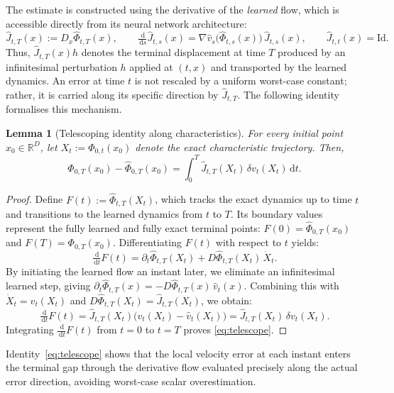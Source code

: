 \documentclass{article}
\newcommand{\R}{\mathbb{R}}
\newcommand{\Id}{\mathrm{Id}}
\newcommand{\dd}{\,\mathrm{d}}
\theoremstyle{plain}
\newtheorem{lemma}[theorem]{Lemma}
\theoremstyle{definition}
\theoremstyle{remark}
\begin{document}
The estimate is constructed using the derivative of the \emph{learned} flow, which is accessible directly from its neural network architecture:
\begin{equation}
  \hat{J}_{t,T}(x) := D_x\hat{\Phi}_{t,T}(x),
  \qquad
  \tfrac{\dd}{\dd s}\hat{J}_{t,s}(x) = \nabla\hat{v}_s\big(\hat{\Phi}_{t,s}(x)\big)\,\hat{J}_{t,s}(x),
  \qquad 
  \hat{J}_{t,t}(x) = \Id.
  \label{eq:jacobian-ode}
\end{equation}
Thus, $\hat{J}_{t,T}(x)h$ denotes the terminal displacement at time $T$ produced by an infinitesimal perturbation $h$ applied at $(t,x)$ and transported by the learned dynamics. An error at time $t$ is not rescaled by a uniform worst-case constant; rather, it is carried along its specific direction by $\hat{J}_{t,T}$. The following identity formalises this mechanism.

\begin{lemma}[Telescoping identity along characteristics]
\label{lem:telescope}
For every initial point $x_0 \in \R^D$, let $X_t := \Phi_{0,t}(x_0)$ denote the exact characteristic trajectory. Then,
\begin{equation}
  \Phi_{0,T}(x_0) - \hat{\Phi}_{0,T}(x_0)
  = \int_0^T \hat{J}_{t,T}(X_t)\,\delta v_t(X_t) \dd t.
  \label{eq:telescope}
\end{equation}
\end{lemma}

\begin{proof}
Define $F(t) := \hat{\Phi}_{t,T}(X_t)$, which tracks the exact dynamics up to time $t$ and transitions to the learned dynamics from $t$ to $T$. Its boundary values represent the fully learned and fully exact terminal points: $F(0) = \hat{\Phi}_{0,T}(x_0)$ and $F(T) = \Phi_{0,T}(x_0)$. Differentiating $F(t)$ with respect to $t$ yields:
\[
  \tfrac{\dd}{\dd t}F(t)
  = \partial_t\hat{\Phi}_{t,T}(X_t) + D\hat{\Phi}_{t,T}(X_t)\,\dot{X}_t.
\]
By initiating the learned flow an instant later, we eliminate an infinitesimal learned step, giving $\partial_t\hat{\Phi}_{t,T}(x) = -D\hat{\Phi}_{t,T}(x)\,\hat{v}_t(x)$. Combining this with $\dot{X}_t = v_t(X_t)$ and $D\hat{\Phi}_{t,T}(X_t) = \hat{J}_{t,T}(X_t)$, we obtain:
\[
  \tfrac{\dd}{\dd t}F(t)
  = \hat{J}_{t,T}(X_t)\big(v_t(X_t) - \hat{v}_t(X_t)\big)
  = \hat{J}_{t,T}(X_t)\,\delta v_t(X_t).
\]
Integrating $\tfrac{\dd}{\dd t}F(t)$ from $t=0$ to $t=T$ proves \eqref{eq:telescope}.
\end{proof}

Identity~\eqref{eq:telescope} shows that the local velocity error at each instant enters the terminal gap through the derivative flow evaluated precisely along the actual error direction, avoiding worst-case scalar overestimation.
\end{document}
